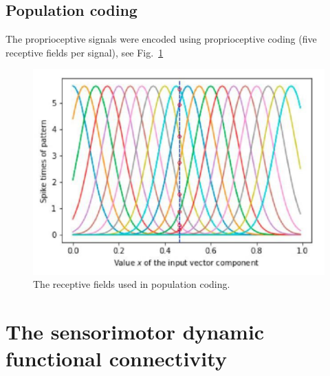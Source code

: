 \subsection{Population coding}
\TODO
The proprioceptive signals were encoded using proprioceptive coding (five receptive fields per signal), see Fig.~\ref{fig:population_coding}
\begin{figure}[!t]
	\begin{center}
		\hspace*{\fill}
		\includegraphics[width=0.99\columnwidth]{population_coding.png}
		\hspace*{\fill}
	\end{center}
	\caption{\label{fig:population_coding} The receptive fields used in population coding.}
\end{figure}
\section{The sensorimotor dynamic functional connectivity}

